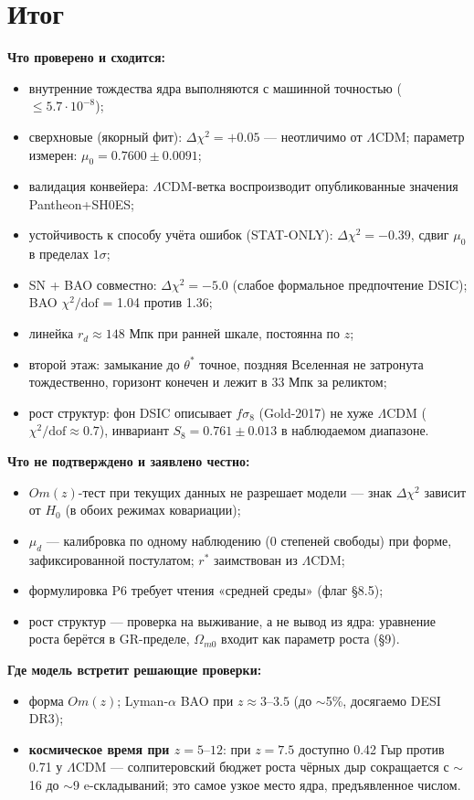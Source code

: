 \documentclass{article}
\begin{document}
\section{Итог}

\noindent\textbf{Что проверено и сходится:}
\begin{itemize}
  \item внутренние тождества ядра выполняются с машинной точностью ($\le 5.7\cdot10^{-8}$);
  \item сверхновые (якорный фит): $\Delta\chi^2 = +0.05$ --- неотличимо от $\Lambda$CDM; параметр измерен: $\mu_0 = 0.7600 \pm 0.0091$;
  \item валидация конвейера: $\Lambda$CDM-ветка воспроизводит опубликованные значения Pantheon+SH0ES;
  \item устойчивость к способу учёта ошибок (STAT-ONLY): $\Delta\chi^2 = -0.39$, сдвиг $\mu_0$ в пределах $1\sigma$;
  \item SN + BAO совместно: $\Delta\chi^2 = -5.0$ (слабое формальное предпочтение DSIC); BAO $\chi^2/\text{dof}$ = 1.04 против 1.36;
  \item линейка $r_d \approx 148$ Мпк при ранней шкале, постоянна по $z$;
  \item второй этаж: замыкание до $\theta^*$ точное, поздняя Вселенная не затронута тождественно, горизонт конечен и лежит в 33 Мпк за реликтом;
  \item рост структур: фон DSIC описывает $f\sigma_8$ (Gold-2017) не хуже $\Lambda$CDM ($\chi^2/\text{dof} \approx 0.7$), инвариант $S_8 = 0.761 \pm 0.013$ в наблюдаемом диапазоне.
\end{itemize}

\noindent\textbf{Что не подтверждено и заявлено честно:}
\begin{itemize}
  \item $Om(z)$-тест при текущих данных не разрешает модели --- знак $\Delta\chi^2$ зависит от $H_0$ (в обоих режимах ковариации);
  \item $\mu_d$ --- калибровка по одному наблюдению (0 степеней свободы) при форме, зафиксированной постулатом; $r^*$ заимствован из $\Lambda$CDM;
  \item формулировка P6 требует чтения «средней среды» (флаг \S8.5);
  \item рост структур --- проверка на выживание, а не вывод из ядра: уравнение роста берётся в GR-пределе, $\Omega_{m0}$ входит как параметр роста (\S9).
\end{itemize}

\noindent\textbf{Где модель встретит решающие проверки:}
\begin{itemize}
  \item форма $Om(z)$; Lyman-$\alpha$ BAO при $z \approx 3\text{--}3.5$ (до $\sim$5\%, досягаемо DESI DR3);
  \item \textbf{космическое время при $z = 5\text{--}12$}: при $z = 7.5$ доступно 0.42 Гыр против 0.71 у $\Lambda$CDM --- солпитеровский бюджет роста чёрных дыр сокращается с $\sim$16 до $\sim$9 e-складываний; это самое узкое место ядра, предъявленное числом.
\end{itemize}
\end{document}
